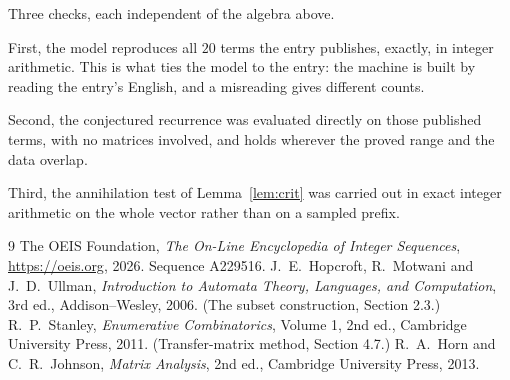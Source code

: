 \documentclass[11pt,a4paper]{article}
\theoremstyle{plain}
\theoremstyle{definition}
\begin{document}
Three checks, each independent of the algebra above.

First, the model reproduces all $20$ terms the entry publishes, exactly, in integer
arithmetic. This is what ties the model to the entry: the machine is built by reading the
entry's English, and a misreading gives different counts.

Second, the conjectured recurrence was evaluated directly on those published terms, with no
matrices involved, and holds wherever the proved range and the data overlap.

Third, the annihilation test of Lemma~\ref{lem:crit} was carried out in exact integer
arithmetic on the whole vector rather than on a sampled prefix.

\begin{thebibliography}{9}
 The OEIS Foundation, \emph{The On-Line Encyclopedia of Integer
Sequences}, \url{https://oeis.org}, 2026. Sequence A229516.
 J.~E.~Hopcroft, R.~Motwani and J.~D.~Ullman, \emph{Introduction to Automata
Theory, Languages, and Computation}, 3rd ed., Addison--Wesley, 2006. (The subset
construction, Section 2.3.)
 R.~P.~Stanley, \emph{Enumerative Combinatorics}, Volume 1, 2nd ed.,
Cambridge University Press, 2011. (Transfer-matrix method, Section 4.7.)
 R.~A.~Horn and C.~R.~Johnson, \emph{Matrix Analysis}, 2nd ed., Cambridge
University Press, 2013.
\end{thebibliography}
\end{document}

